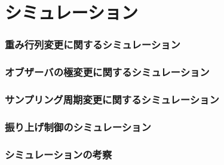\chapter{シミュレーション}

\subsection{重み行列変更に関するシミュレーション}

\subsection{オブザーバの極変更に関するシミュレーション}

\subsection{サンプリング周期変更に関するシミュレーション}

\subsection{振り上げ制御のシミュレーション}

\subsection{シミュレーションの考察}

